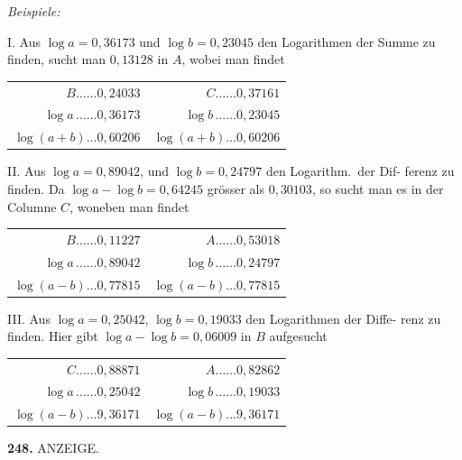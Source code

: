 \documentclass[12pt,a4paper]{article}
\begin{document}
\smallskip\noindent
\textit{Beispiele:}

\smallskip\noindent
\textsc{I.} Aus $\log a = 0{,}36173$ und $\log b = 0{,}23045$ den Logarithmen der Summe
zu finden, sucht man $0{,}13128$ in $A$, wobei man findet
\begin{center}
\begin{tabular}{@{}r@{\quad}r@{}}
$B \ldots\ldots 0{,}24033$ & $C \ldots\ldots 0{,}37161$ \\
$\log a \,\ldots\ldots 0{,}36173$ & $\log b \,\ldots\ldots 0{,}23045$ \\[2pt]
$\log(a+b)\ldots 0{,}60206$ & $\log(a+b)\ldots 0{,}60206$
\end{tabular}
\end{center}

\smallskip\noindent
\textsc{II.} Aus $\log a = 0{,}89042$, und $\log b = 0{,}24797$ den Logarithm.\ der Dif-
ferenz zu finden. Da $\log a - \log b = 0{,}64245$ grösser als $0{,}30103$, so sucht
man es in der Columne $C$, woneben man findet
\begin{center}
\begin{tabular}{@{}r@{\quad}r@{}}
$B \ldots\ldots 0{,}11227$ & $A \ldots\ldots 0{,}53018$ \\
$\log a \,\ldots\ldots 0{,}89042$ & $\log b \,\ldots\ldots 0{,}24797$ \\[2pt]
$\log(a-b)\ldots 0{,}77815$ & $\log(a-b)\ldots 0{,}77815$
\end{tabular}
\end{center}

\smallskip\noindent
\textsc{III.} Aus $\log a = 0{,}25042$, $\log b = 0{,}19033$ den Logarithmen der Diffe-
renz zu finden. Hier gibt $\log a - \log b = 0{,}06009$ in $B$ aufgesucht
\begin{center}
\begin{tabular}{@{}r@{\quad}r@{}}
$C \ldots\ldots 0{,}88871$ & $A \ldots\ldots 0{,}82862$ \\
$\log a \,\ldots\ldots 0{,}25042$ & $\log b \,\ldots\ldots 0{,}19033$ \\[2pt]
$\log(a-b)\ldots 9{,}36171$ & $\log(a-b)\ldots 9{,}36171$
\end{tabular}
\end{center}

\newpage
\noindent\textbf{248.}\quad
ANZEIGE.
\end{document}
